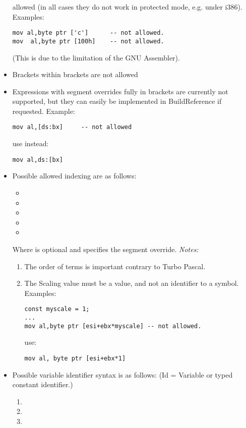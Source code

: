 \begin{itemize}
   allowed (in all cases they do not work in protected mode,
   e.g. under \linux i386). Examples:
\begin{verbatim}
mov al,byte ptr ['c']      -- not allowed.
mov  al,byte ptr [100h]    -- not allowed.
\end{verbatim}
 (This is due to the limitation of the GNU Assembler).
\item  Brackets within brackets are not allowed
\item  Expressions with segment overrides fully in brackets are
currently not supported, but they can easily be implemented
in BuildReference if requested. Example:
\begin{verbatim}
mov al,[ds:bx]     -- not allowed
\end{verbatim}
use instead:
\begin{verbatim}
mov al,ds:[bx]
\end{verbatim}
\item  Possible allowed indexing are as follows:
\begin{itemize}
\item    {}
\item    {}
\item    {}
\item    {}
\item    {}
\end{itemize}
Where  is optional and specifies the segment override.
{\em Notes:}
\begin{enumerate}
\item The order of terms is important contrary to Turbo Pascal.
\item The Scaling value must be a value, and not an identifier
to a symbol. Examples:
\begin{verbatim}
const myscale = 1;
...
mov al,byte ptr [esi+ebx*myscale] -- not allowed.
\end{verbatim}
use:
\begin{verbatim}
mov al, byte ptr [esi+ebx*1]
\end{verbatim}
\end{enumerate}
\item  Possible variable identifier syntax is as follows:
 (Id = Variable or typed constant identifier.)
\begin{enumerate}
\item {}
\item \var{[ID]}
\item \var{[ID+expr]}

\end{enumerate}
\end{itemize}
